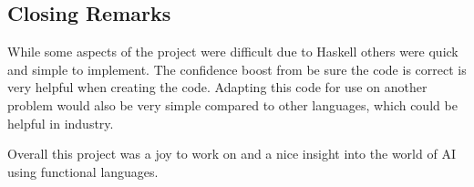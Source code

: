\documentclass[a4paper]{article}
\begin{document}
\subsection{Closing Remarks}
While some aspects of the project were difficult due to Haskell others were quick and simple to implement.
The confidence boost from be sure the code is correct is very helpful when creating the code.
Adapting this code for use on another problem would also be very simple compared to other languages, which could be helpful in industry.
\par
Overall this project was a joy to work on and a nice insight into the world of AI using functional languages.
\end{document}

